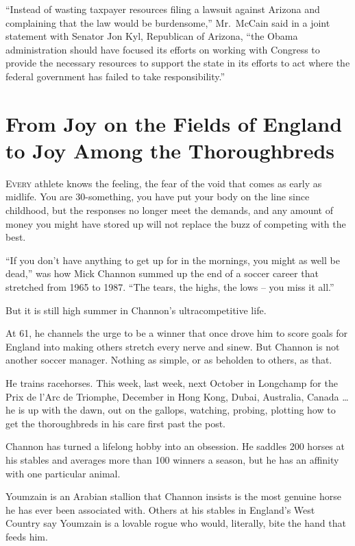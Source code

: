﻿\documentclass[12pt]{article}
\begin{document}
``Instead of wasting taxpayer resources filing a lawsuit against Arizona and complaining that the
law would be burdensome,'' Mr.~McCain said in a joint statement with Senator Jon Kyl, Republican of
Arizona, ``the Obama administration should have focused its efforts on working with Congress to
provide the necessary resources to support the state in its efforts to act where the federal
government has failed to take responsibility.''

\section{From Joy on the Fields of England to Joy Among the Thoroughbreds}

\lettrine{E}{very} athlete knows the feeling, the fear of the void that
comes as early as midlife. You are 30-something, you have put your body on the line since childhood,
but the responses no longer meet the demands, and any amount of money you might have stored up will
not replace the buzz of competing with the best.

``If you don't have anything to get up for in the mornings, you might as well be dead,'' was how
Mick Channon summed up the end of a soccer career that stretched from 1965 to 1987. ``The tears, the
highs, the lows -- you miss it all.''

But it is still high summer in Channon's ultracompetitive life.

At 61, he channels the urge to be a winner that once drove him to score goals for England into
making others stretch every nerve and sinew. But Channon is not another soccer manager. Nothing as
simple, or as beholden to others, as that.

He trains racehorses. This week, last week, next October in Longchamp for the Prix de l'Arc de
Triomphe, December in Hong Kong, Dubai, Australia, Canada \ldots he is up with the dawn, out on the
gallops, watching, probing, plotting how to get the thoroughbreds in his care first past the post.

Channon has turned a lifelong hobby into an obsession. He saddles 200 horses at his stables and
averages more than 100 winners a season, but he has an affinity with one particular animal.

Youmzain is an Arabian stallion that Channon insists is the most genuine horse he has ever been
associated with. Others at his stables in England's West Country say Youmzain is a lovable rogue who
would, literally, bite the hand that feeds him.
\end{document}
